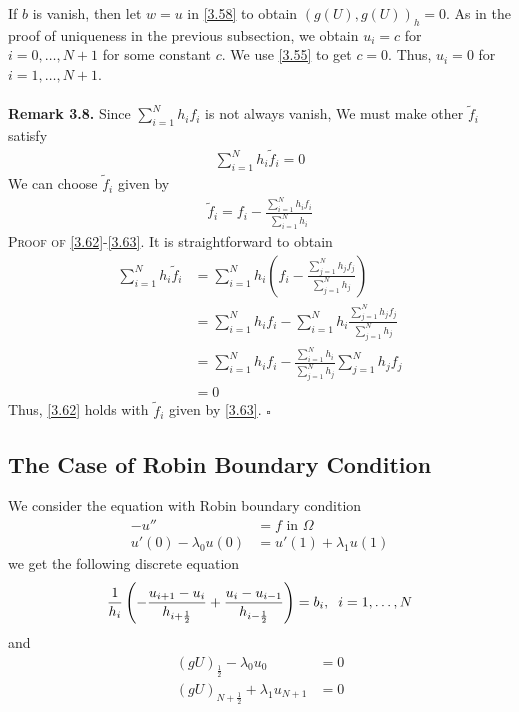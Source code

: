 \documentclass[a4paper]{article}
\numberwithin{equation}{section}
\begin{document}
If $b$ is vanish, then let $w=u$ in \eqref{3.58} to obtain ${\left( {g\left( U \right),g\left( U \right)} \right)_h} = 0$. As in the proof of uniqueness in the previous subsection, we obtain $u_i=c$ for $i=0,\ldots,N+1$ for some constant $c$. We use \eqref{3.55} to get $c=0$. Thus, $u_i=0$ for $i=1,\ldots,N+1$.\\
\\
\textbf{Remark 3.8.} Since $\sum\limits_{i = 1}^N {{h_i}{f_i}} $ is not always vanish, We must make other $\widetilde{f}_i$ satisfy
\begin{align}
\label{3.62}
\sum\limits_{i = 1}^N {{h_i}{{\widetilde f}_i}}  = 0
\end{align}
We can choose $\widetilde{f}_i$ given by
\begin{align}
\label{3.63}
{\widetilde f_i} = {f_i} - \frac{{\sum\limits_{i = 1}^N {{h_i}{f_i}} }}{{\sum\limits_{i = 1}^N {{h_i}} }}
\end{align}
\textsc{Proof of \eqref{3.62}-\eqref{3.63}.} It is straightforward to obtain
\begin{align}
\sum\limits_{i = 1}^N {{h_i}{{\widetilde f}_i}}  &= \sum\limits_{i = 1}^N {{h_i}\left( {{f_i} - \frac{{\sum\limits_{j = 1}^N {{h_j}{f_j}} }}{{\sum\limits_{j = 1}^N {{h_j}} }}} \right)} \\
& = \sum\limits_{i = 1}^N {{h_i}{f_i}}  - \sum\limits_{i = 1}^N {{h_i}\frac{{\sum\limits_{j = 1}^N {{h_j}{f_j}} }}{{\sum\limits_{j = 1}^N {{h_j}} }}} \\
& = \sum\limits_{i = 1}^N {{h_i}{f_i}}  - \frac{{\sum\limits_{i = 1}^N {{h_i}} }}{{\sum\limits_{j = 1}^N {{h_j}} }}\sum\limits_{j = 1}^N {{h_j}{f_j}} \\
& = 0
\end{align}
Thus, \eqref{3.62} holds with $\widetilde{f}_i$ given by \eqref{3.63}. \hfill $\square$
\subsection{The Case of Robin Boundary Condition}
We consider the equation with Robin boundary condition
\begin{align}
 - {u''} &= f\mbox{ in } \Omega \\
u'\left( 0 \right) - {\lambda _0}u\left( 0 \right)& = u'\left( 1 \right) + {\lambda _1}u\left( 1 \right)
\end{align}
we get the following discrete equation
\begin{align}
\frac{1}{{{h_i}}}\left( { - \frac{{{u_{i + 1}} - {u_i}}}{{{h_{i + \frac{1}{2}}}}} + \frac{{{u_i} - {u_{i - 1}}}}{{{h_{i - \frac{1}{2}}}}}} \right) = {b_i},\hspace{0.2cm} i = 1, \ldots ,N
\end{align}
and 
\begin{align}
{\left( {gU} \right)_{\frac{1}{2}}} - {\lambda _0}{u_0} &= 0\\
{\left( {gU} \right)_{N + \frac{1}{2}}} + {\lambda _1}{u_{N + 1}} &= 0
\end{align}
\end{document}
